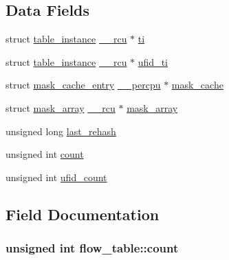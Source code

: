 \subsection*{Data Fields}
\begin{DoxyCompactItemize}
\item 
struct \hyperlink{structtable__instance}{table\+\_\+instance} \hyperlink{compiler_8h_a2b3b0c016258969e4b39c66b6eec2129}{\+\_\+\+\_\+rcu} $\ast$ \hyperlink{structflow__table_a49d708e68608d510f6d25a16a14fd565}{ti}
\item 
struct \hyperlink{structtable__instance}{table\+\_\+instance} \hyperlink{compiler_8h_a2b3b0c016258969e4b39c66b6eec2129}{\+\_\+\+\_\+rcu} $\ast$ \hyperlink{structflow__table_aa29e185501af8dcd15549ee157c6c047}{ufid\+\_\+ti}
\item 
struct \hyperlink{structmask__cache__entry}{mask\+\_\+cache\+\_\+entry} \hyperlink{compiler_8h_a497f20279760cdb59a5187689f9f5ab1}{\+\_\+\+\_\+percpu} $\ast$ \hyperlink{structflow__table_a7395c72250199771559f2aaf32da5d0d}{mask\+\_\+cache}
\item 
struct \hyperlink{structmask__array}{mask\+\_\+array} \hyperlink{compiler_8h_a2b3b0c016258969e4b39c66b6eec2129}{\+\_\+\+\_\+rcu} $\ast$ \hyperlink{structflow__table_a0e568d59590f38936b714555597505be}{mask\+\_\+array}
\item 
unsigned long \hyperlink{structflow__table_a82c7cfef05b2898b3ffb3b6cb6fdc6a4}{last\+\_\+rehash}
\item 
unsigned int \hyperlink{structflow__table_a97cae1e714c6dcfe0d39ce4cff371786}{count}
\item 
unsigned int \hyperlink{structflow__table_ad8ff1e259e64690608d9552f0b467bf0}{ufid\+\_\+count}
\end{DoxyCompactItemize}


\subsection{Field Documentation}
\hypertarget{structflow__table_a97cae1e714c6dcfe0d39ce4cff371786}{}
\subsubsection[{count}]{\setlength{\rightskip}{0pt plus 5cm}unsigned int flow\+\_\+table\+::count}\label{structflow__table_a97cae1e714c6dcfe0d39ce4cff371786}
\hypertarget{structflow__table_a82c7cfef05b2898b3ffb3b6cb6fdc6a4}{}
